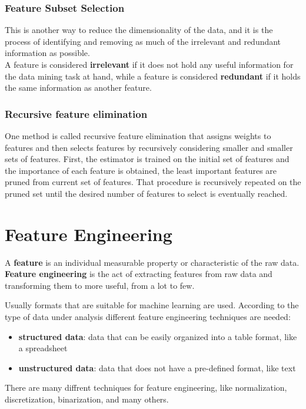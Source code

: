 \subsubsection{Feature Subset Selection}
This is another way to reduce the dimensionality of the data, and it
is the process of identifying and removing as much of the irrelevant 
and redundant information as possible.\\
A feature is considered \textbf{irrelevant} if it does not hold any
useful information for the data mining task at hand, while a feature
is considered \textbf{redundant} if it holds the same information as 
another feature.
\subsubsection{Recursive feature elimination}
One method is called recursive feature elimination that assigns
weights to features and then selects features by recursively 
considering smaller and smaller sets of features.  First, the 
estimator is trained on the initial set of features and the 
importance of each feature is obtained, the least important features 
are pruned from current set of features. That procedure is 
recursively repeated on the pruned set until the desired number of 
features to select is eventually reached.
\section{Feature Engineering}
\begin{boxH}
  A \textbf{feature} is an individual measurable property or
  characteristic of the raw data. \textbf{Feature engineering} is the 
  act of extracting features from raw data and transforming them to 
  more useful, from a lot to few.
\end{boxH}
Usually formats that are suitable for machine learning are used.
According to the type of data under analysis different feature
engineering techniques are needed:
\begin{itemize}
  \item \textbf{structured data}: data that can be easily organized
    into a table format, like a spreadsheet
  \item \textbf{unstructured data}: data that does not have a 
    pre-defined format, like text
\end{itemize}
There are many diffrent techniques for feature engineering, like
normalization, discretization, binarization, and many others.

